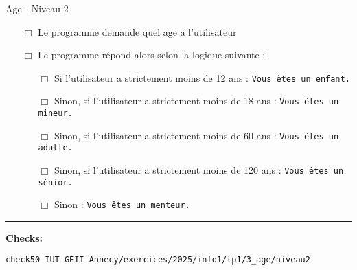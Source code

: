 \begin{UPSTIcahierDesCharges}{Age - Niveau 2}
	\begin{itemize}
		\item[$\Box$] Le programme demande quel age a l'utilisateur
		\item[$\Box$] Le programme répond alors selon la logique suivante :
		      \begin{itemize}
			      \item[$\Box$] Si l'utilisateur a strictement moins de 12 ans : \texttt{Vous êtes un enfant.}
			      \item[$\Box$] Sinon, si l'utilisateur a strictement moins de 18 ans : \texttt{Vous êtes un mineur.}
			      \item[$\Box$] Sinon, si l'utilisateur a strictement moins de 60 ans : \texttt{Vous êtes un adulte.}
			      \item[$\Box$] Sinon, si l'utilisateur a strictement moins de 120 ans : \texttt{Vous êtes un sénior.}
			      \item[$\Box$] Sinon : \texttt{Vous êtes un menteur.}
		      \end{itemize}
	\end{itemize}
	\hrule
	\textbf{Checks:}
	\begin{lstlisting}[language=bash,style=console]
check50 IUT-GEII-Annecy/exercices/2025/info1/tp1/3_age/niveau2
\end{lstlisting}
\end{UPSTIcahierDesCharges}